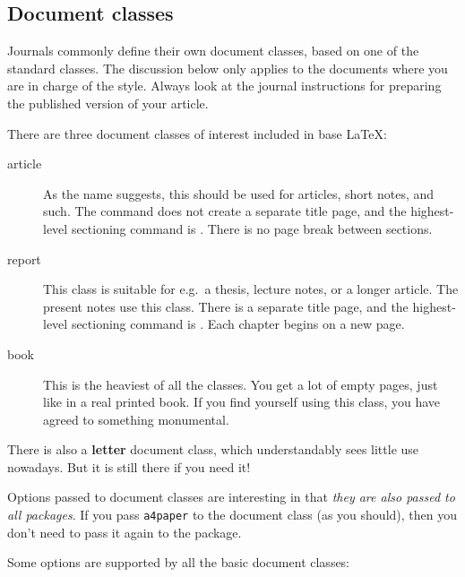 %
\subsection{Document classes}

\begin{practices}
Journals commonly define their own document classes, based on one of the standard classes.
The discussion below only applies to the documents where you are in charge of the style.
Always look at the journal instructions for preparing the published version of your article.
\end{practices}

There are three document classes of interest included in base \LaTeX{}:

\begin{description}
\item[article] As the name suggests, this should be used for articles, short notes, and such.
    The  command does not create a separate title page,
    and the highest-level sectioning command is .
    There is no page break between sections.
\item[report] This class is suitable for e.g.\ a thesis, lecture notes, or a longer article.
    The present notes use this class.
    There is a separate title page,
    and the highest-level sectioning command is .
    Each chapter begins on a new page.
\item[book] This is the heaviest of all the classes.
    You get a lot of empty pages, just like in a real printed book.
    If you find yourself using this class,
    you have agreed to something monumental.
\end{description}
%
There is also a \textbf{letter} document class,
which understandably sees little use nowadays.
But it is still there if you need it!

Options passed to document classes are interesting in that
\emph{they are also passed to all packages}.
If you pass \verb|a4paper| to the document class (as you should),
then you don't need to pass it again to the  package.

Some options are supported by all the basic document classes:

